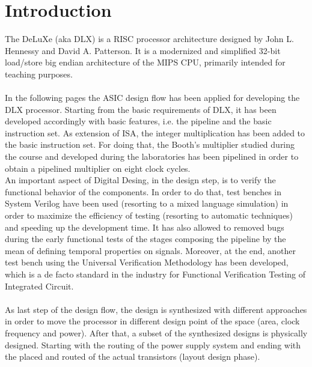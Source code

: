\chapter{Introduction}
\label{Introduction}
The DeLuXe (aka DLX) is a RISC processor architecture designed by John L. Hennessy and David A. Patterson. It is a modernized and simplified 32-bit load/store big endian architecture of the MIPS CPU, primarily intended for teaching purposes.\\\\
In the following pages the ASIC design flow has been applied for developing the DLX processor. Starting from the basic requirements of DLX, it has been developed accordingly with basic features, i.e. the pipeline and the basic instruction set.
As extension of ISA, the integer multiplication has been added to the basic instruction set. For doing that, the Booth's multiplier studied during the course and developed during the laboratories has been pipelined in order to obtain a pipelined multiplier on eight clock cycles.\\
An important aspect of Digital Desing, in the design step, is to verify the functional behavior of the components. In order to do that, test benches in System Verilog have been used (resorting to a mixed language simulation) in order to maximize the efficiency of testing (resorting to automatic techniques) and speeding up the development time. It has also allowed to removed bugs during the early functional tests of the stages composing the pipeline by the mean of defining temporal properties on signals.
Moreover, at the end, another test bench using the Universal Verification Methodology has been developed, which is a de facto standard in the industry for Functional Verification Testing of Integrated Circuit\cite{website:1}.\\\\
As last step of the design flow, the design is synthesized with different approaches in order to move the processor in different design point of the space (area, clock frequency and power). After that, a subset of the synthesized designs is physically designed. Starting with the routing of the power supply system and ending with the placed and routed of the actual transistors (layout design phase).